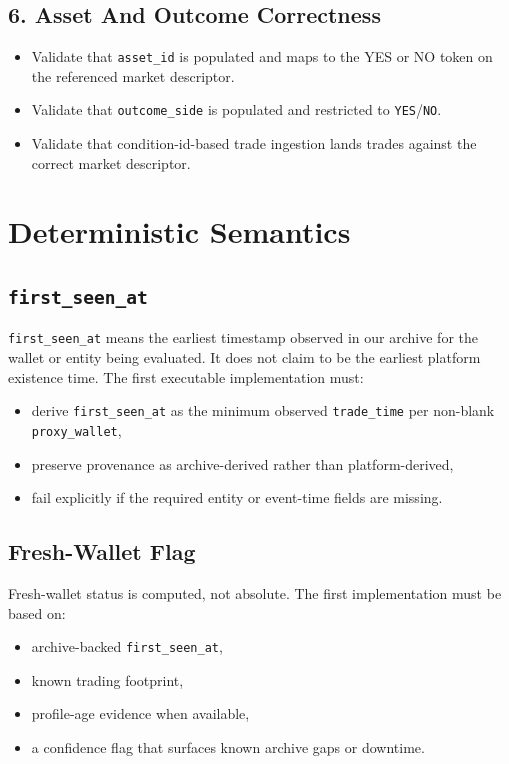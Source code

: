 \documentclass{article}
\begin{document}
\subsection*{6. Asset And Outcome Correctness}
\begin{itemize}
\item Validate that \texttt{asset\_id} is populated and maps to the YES or NO
token on the referenced market descriptor.
\item Validate that \texttt{outcome\_side} is populated and restricted to
\texttt{YES}/\texttt{NO}.
\item Validate that condition-id-based trade ingestion lands trades against the
correct market descriptor.
\end{itemize}

\section*{Deterministic Semantics}

\subsection*{\texttt{first\_seen\_at}}

\texttt{first\_seen\_at} means the earliest timestamp observed in our archive for
the wallet or entity being evaluated. It does not claim to be the earliest
platform existence time. The first executable implementation must:
\begin{itemize}
\item derive \texttt{first\_seen\_at} as the minimum observed
\texttt{trade\_time} per non-blank \texttt{proxy\_wallet},
\item preserve provenance as archive-derived rather than platform-derived,
\item fail explicitly if the required entity or event-time fields are missing.
\end{itemize}

\subsection*{Fresh-Wallet Flag}

Fresh-wallet status is computed, not absolute. The first implementation must be
based on:
\begin{itemize}
\item archive-backed \texttt{first\_seen\_at},
\item known trading footprint,
\item profile-age evidence when available,
\item a confidence flag that surfaces known archive gaps or downtime.
\end{itemize}
\end{document}
